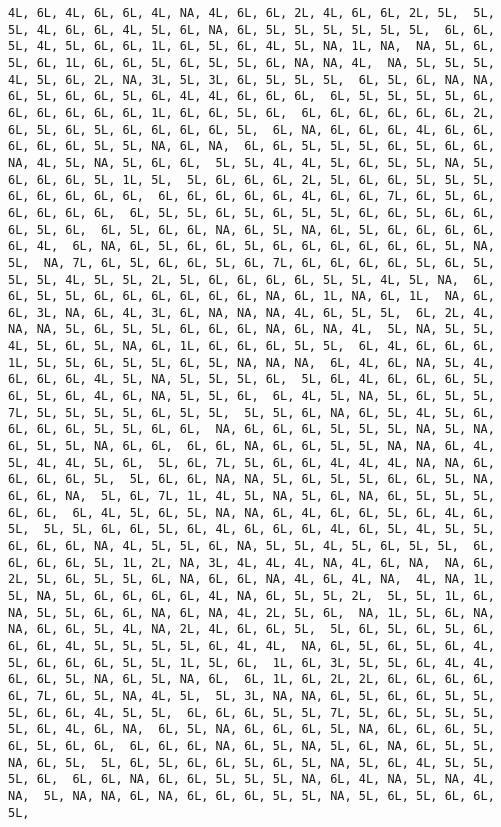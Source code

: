 \documentclass[
]{article}
\begin{document}
\begin{verbatim}
4L, 6L, 4L, 6L, 6L, 4L, NA, 4L, 6L, 6L, 2L, 4L, 6L, 6L, 2L, 5L,  5L, 5L, 4L, 6L, 6L, 4L, 5L, 6L, NA, 6L, 5L, 5L, 5L, 5L, 5L, 5L,  6L, 6L, 5L, 4L, 5L, 6L, 6L, 1L, 6L, 5L, 6L, 4L, 5L, NA, 1L, NA,  NA, 5L, 6L, 5L, 6L, 1L, 6L, 6L, 5L, 6L, 5L, 5L, 6L, NA, NA, 4L,  NA, 5L, 5L, 5L, 4L, 5L, 6L, 2L, NA, 3L, 5L, 3L, 6L, 5L, 5L, 5L,  6L, 5L, 6L, NA, NA, 6L, 5L, 6L, 6L, 5L, 6L, 4L, 4L, 6L, 6L, 6L,  6L, 5L, 5L, 5L, 5L, 6L, 6L, 6L, 6L, 6L, 6L, 1L, 6L, 6L, 5L, 6L,  6L, 6L, 6L, 6L, 6L, 6L, 2L, 6L, 5L, 6L, 5L, 6L, 6L, 6L, 6L, 5L,  6L, NA, 6L, 6L, 6L, 4L, 6L, 6L, 6L, 6L, 6L, 5L, 5L, NA, 6L, NA,  6L, 6L, 5L, 5L, 5L, 6L, 5L, 6L, 6L, NA, 4L, 5L, NA, 5L, 6L, 6L,  5L, 5L, 4L, 4L, 5L, 6L, 5L, 5L, NA, 5L, 6L, 6L, 6L, 5L, 1L, 5L,  5L, 6L, 6L, 6L, 2L, 5L, 6L, 6L, 5L, 5L, 5L, 6L, 6L, 6L, 6L, 6L,  6L, 6L, 6L, 6L, 6L, 4L, 6L, 6L, 7L, 6L, 5L, 6L, 6L, 6L, 6L, 6L,  6L, 5L, 5L, 6L, 5L, 6L, 5L, 5L, 6L, 6L, 5L, 6L, 6L, 6L, 5L, 6L,  6L, 5L, 6L, 6L, NA, 6L, 5L, NA, 6L, 5L, 6L, 6L, 6L, 6L, 6L, 4L,  6L, NA, 6L, 5L, 6L, 6L, 5L, 6L, 6L, 6L, 6L, 6L, 6L, 5L, NA, 5L,  NA, 7L, 6L, 5L, 6L, 6L, 5L, 6L, 7L, 6L, 6L, 6L, 6L, 5L, 6L, 5L,  5L, 5L, 4L, 5L, 5L, 2L, 5L, 6L, 6L, 6L, 6L, 5L, 5L, 4L, 5L, NA,  6L, 6L, 5L, 5L, 6L, 6L, 6L, 6L, 6L, 6L, NA, 6L, 1L, NA, 6L, 1L,  NA, 6L, 6L, 3L, NA, 6L, 4L, 3L, 6L, NA, NA, NA, 4L, 6L, 5L, 5L,  6L, 2L, 4L, NA, NA, 5L, 6L, 5L, 5L, 6L, 6L, 6L, NA, 6L, NA, 4L,  5L, NA, 5L, 5L, 4L, 5L, 6L, 5L, NA, 6L, 1L, 6L, 6L, 6L, 5L, 5L,  6L, 4L, 6L, 6L, 6L, 1L, 5L, 5L, 6L, 5L, 5L, 6L, 5L, NA, NA, NA,  6L, 4L, 6L, NA, 5L, 4L, 6L, 6L, 6L, 4L, 5L, NA, 5L, 5L, 5L, 6L,  5L, 6L, 4L, 6L, 6L, 6L, 5L, 6L, 5L, 6L, 4L, 6L, NA, 5L, 5L, 6L,  6L, 4L, 5L, NA, 5L, 6L, 5L, 5L, 7L, 5L, 5L, 5L, 5L, 6L, 5L, 5L,  5L, 5L, 6L, NA, 6L, 5L, 4L, 5L, 6L, 6L, 6L, 6L, 5L, 5L, 6L, 6L,  NA, 6L, 6L, 6L, 5L, 5L, 5L, NA, 5L, NA, 6L, 5L, 5L, NA, 6L, 6L,  6L, 6L, NA, 6L, 6L, 5L, 5L, NA, NA, 6L, 4L, 5L, 4L, 4L, 5L, 6L,  5L, 6L, 7L, 5L, 6L, 6L, 4L, 4L, 4L, NA, NA, 6L, 6L, 6L, 6L, 5L,  5L, 6L, 6L, NA, NA, 5L, 6L, 5L, 5L, 6L, 6L, 5L, NA, 6L, 6L, NA,  5L, 6L, 7L, 1L, 4L, 5L, NA, 5L, 6L, NA, 6L, 5L, 5L, 5L, 6L, 6L,  6L, 4L, 5L, 6L, 5L, NA, NA, 6L, 4L, 6L, 6L, 5L, 6L, 4L, 6L, 5L,  5L, 5L, 6L, 6L, 5L, 6L, 4L, 6L, 6L, 6L, 4L, 6L, 5L, 4L, 5L, 5L,  6L, 6L, 6L, NA, 4L, 5L, 5L, 6L, NA, 5L, 5L, 4L, 5L, 6L, 5L, 5L,  6L, 6L, 6L, 6L, 5L, 1L, 2L, NA, 3L, 4L, 4L, 4L, NA, 4L, 6L, NA,  NA, 6L, 2L, 5L, 6L, 5L, 5L, 6L, NA, 6L, 6L, NA, 4L, 6L, 4L, NA,  4L, NA, 1L, 5L, NA, 5L, 6L, 6L, 6L, 6L, 4L, NA, 6L, 5L, 5L, 2L,  5L, 5L, 1L, 6L, NA, 5L, 5L, 6L, 6L, NA, 6L, NA, 4L, 2L, 5L, 6L,  NA, 1L, 5L, 6L, NA, NA, 6L, 6L, 5L, 4L, NA, 2L, 4L, 6L, 6L, 5L,  5L, 6L, 5L, 6L, 5L, 6L, 6L, 6L, 4L, 5L, 5L, 5L, 5L, 6L, 4L, 4L,  NA, 6L, 5L, 6L, 5L, 6L, 4L, 5L, 6L, 6L, 6L, 5L, 5L, 1L, 5L, 6L,  1L, 6L, 3L, 5L, 5L, 6L, 4L, 4L, 6L, 6L, 5L, NA, 6L, 5L, NA, 6L,  6L, 1L, 6L, 2L, 2L, 6L, 6L, 6L, 6L, 6L, 7L, 6L, 5L, NA, 4L, 5L,  5L, 3L, NA, NA, 6L, 5L, 6L, 6L, 5L, 5L, 5L, 6L, 6L, 4L, 5L, 5L,  6L, 6L, 6L, 5L, 5L, 7L, 5L, 6L, 5L, 5L, 5L, 5L, 6L, 4L, 6L, NA,  6L, 5L, NA, 6L, 6L, 6L, 5L, NA, 6L, 6L, 6L, 5L, 6L, 5L, 6L, 6L,  6L, 6L, 6L, NA, 6L, 5L, NA, 5L, 6L, NA, 6L, 5L, 5L, NA, 6L, 5L,  5L, 6L, 5L, 6L, 6L, 5L, 6L, 5L, NA, 5L, 6L, 4L, 5L, 5L, 5L, 6L,  6L, 6L, NA, 6L, 6L, 5L, 5L, 5L, NA, 6L, 4L, NA, 5L, NA, 4L, NA,  5L, NA, NA, 6L, NA, 6L, 6L, 6L, 5L, 5L, NA, 5L, 6L, 5L, 6L, 6L,  5L, 
\end{verbatim}
\end{document}
